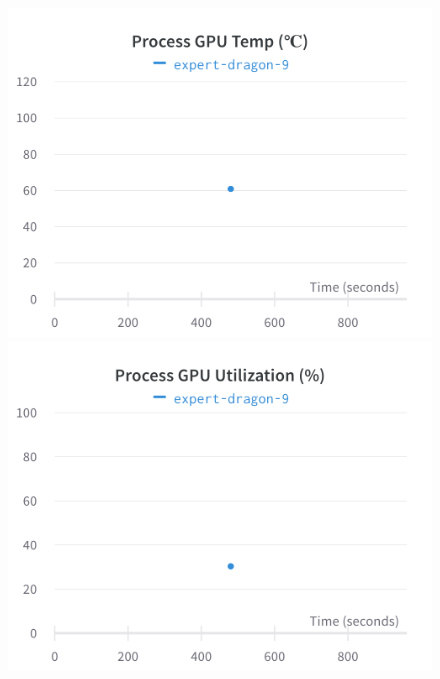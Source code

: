 \documentclass{article}
\begin{document}
\begin{figure}[!htb]
\includegraphics[width=\linewidth]{charts/Section-6-Panel-2-kj5f6xgyo}
\caption{}
\endminipage\hfill
{}
\includegraphics[width=\linewidth]{charts/Section-6-Panel-3-p97959r75}
\caption{}
\endminipage
\end{figure}
\end{document}
